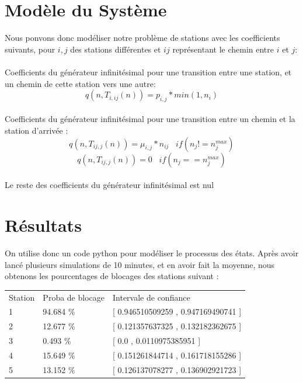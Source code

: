 \documentclass[12pt,a4paper]{article}
\begin{document}
\section{Modèle du Système}

Nous ponvons donc modéliser notre problème de stations avec les coefficients suivants, pour $i,j$ des stations différentes et $ij$ représentant le chemin entre $i$ et $j$:

\paragraph*{}
Coefficients du générateur infinitésimal pour une transition entre une station, et un chemin de cette station vers une autre:
$$
q(n, T_{i,ij} (n)) = p_{i,j} * min(1,n_i)
$$

\paragraph*{}
Coefficients du générateur infinitésimal pour une transition entre un chemin et la station d'arrivée :
$$
q(n, T_{ij,j} (n)) = \mu_{i,j} * n_{ij} \;\;\; if(n_j != n^{max}_j)
$$
$$
q(n, T_{ij,j} (n)) = 0 \;\;\; if(n_j == n^{max}_j)
$$

\paragraph*{}
Le reste des coefficients du générateur infinitésimal est nul


\section{Résultats}

On utilise donc un code python pour modéliser le processus des états. Après avoir lancé plusieurs simulations de 10 minutes, et en avoir fait la moyenne, nous obtenons les pourcentages de blocages des stations suivant :

\begin{tabular}{ l l l }
	 Station & Proba de blocage & Intervale de confiance \\
   1 & 94.684 \% & [ 0.946510509259 , 0.947169490741 ] \\
   2 & 12.677 \% & [ 0.121357637325 , 0.132182362675 ] \\
   3 & 0.493 \% & [ 0.0 , 0.0110975385951 ] \\
   4 & 15.649 \% & [ 0.151261844714 , 0.161718155286 ] \\
   5 & 13.152 \% & [ 0.126137078277 , 0.136902921723 ] \\
 \end{tabular}
\end{document}

